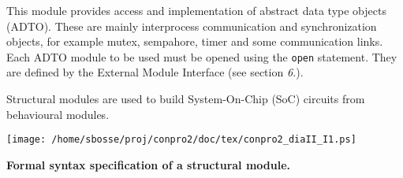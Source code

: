 \documentclass[a4paper,12pt,twoside,english]{article}
\begin{document}
\def\thesubsubsection{\tocX}
\secIII{\label{toclabelX}\thesubsubsection}
This module  provides access and implementation of abstract data type objects (ADTO). These are mainly
interprocess communication and synchronization objects, for example mutex, sempahore, timer and some communication links. Each ADTO module to be used must be
opened using the {\tt open} statement. They are defined by the External Module Interface (see section {\it 6.}).


\vskip5pt



\def\thesubsubsection{\tocXI}
\secIII{\label{toclabelXI}\thesubsubsection}
Structural modules are used to build System-On-Chip (SoC) circuits from behavioural modules.


\vskip5pt
\def\defcontent{
\begin{center}
\texttt{[image: /home/sbosse/proj/conpro2/doc/tex/conpro2\_diaII\_I1.ps]}\\\vskip3pt
\end{center}
}
\def\defdescription{
\caption{\bf Formal syntax specification of  a structural module.
}
\label{def:2}}

\begin{definition}
\let\normalsize\footnotesize \normalsize
\defcontent
\defdescription

\end{definition}
\end{document}
